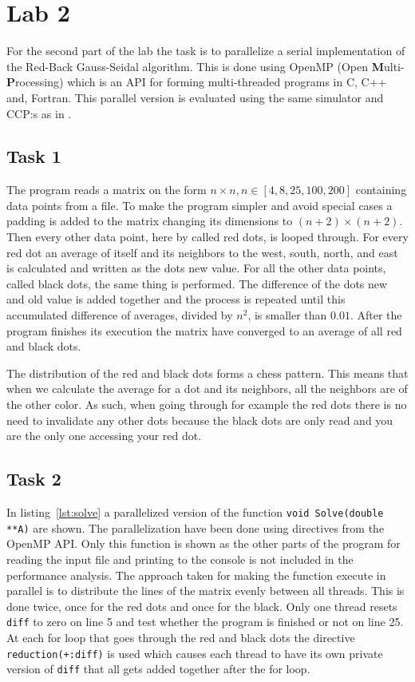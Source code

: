 \section{Lab 2}
\label{sec:lab2}
For the second part of the lab the task is to parallelize a serial implementation of the Red-Back Gauss-Seidal algorithm. This is done using OpenMP (Open \textbf Multi-\textbf Processing) which is an API for forming multi-threaded programs in C, C++ and, Fortran. This parallel version is evaluated using the same simulator and CCP:s as in . 

\subsection{Task 1}
The program reads a matrix on the form $n \times n, n \in [4,8,25,100,200]$ containing data points from a file. To make the program simpler and avoid special cases a padding is added to the matrix changing its dimensions to $(n+2) \times (n+2)$. Then every other data point, here by called red dots, is looped through. For every red dot an average of itself and its neighbors to the west, south, north, and east is calculated and written as the dots new value. For all the other data points, called black dots, the same thing is performed. The difference of the dots new and old value is added together and the process is repeated until this accumulated difference of averages, divided by $n^2$, is smaller than $0.01$. After the program finishes its execution the matrix have converged to an average of all red and black dots.

The distribution of the red and black dots forms a chess pattern. This means that when we calculate the average for a dot and its neighbors, all the neighbors are of the other color. As such, when going through for example the red dots there is no need to invalidate any other dots because the black dots are only read and you are the only one accessing your red dot.

\subsection{Task 2}
In listing~\ref{lst:solve} a parallelized version of the function \texttt{void Solve(double **A)} are shown. The parallelization have been done using directives from the OpenMP API. Only this function is shown as the other parts of the program for reading the input file and printing to the console is not included in the performance analysis. The approach taken for making the function execute in parallel is to distribute the lines of the matrix evenly between all threads. This is done twice, once for the red dots and once for the black. Only one thread resets \texttt{diff} to zero on line 5 and test whether the program is finished or not on line 25. At each for loop that goes through the red and black dots the directive \texttt{reduction(+:diff)} is used which causes each thread to have its own private version of \texttt{diff} that all gets added together after the for loop.


